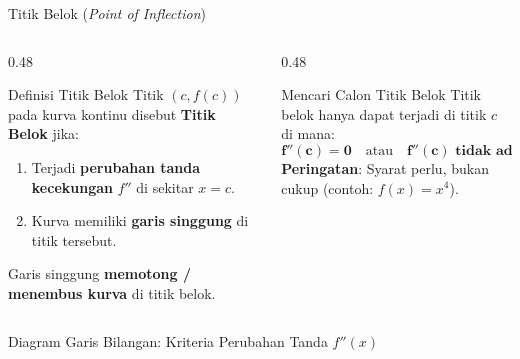\documentclass[aspectratio=169,10pt]{beamer}
\begin{document}
\begin{frame}{Titik Belok (\textit{Point of Inflection})}
    \begin{columns}[T]
        \begin{column}{0.48\textwidth}
            \begin{block}{Definisi Titik Belok}
                Titik $(c, f(c))$ pada kurva kontinu disebut \textbf{Titik Belok} jika:
                \begin{enumerate}
                    \item Terjadi \textbf{perubahan tanda kecekungan} $f''$ di sekitar $x = c$.
                    \item Kurva memiliki \textbf{garis singgung} di titik tersebut.
                \end{enumerate}
                {\scriptsize \color{SoftGray} Garis singgung \textbf{memotong / menembus kurva} di titik belok.}
            \end{block}
        \end{column}

        \begin{column}{0.48\textwidth}
            \begin{exampleblock}{Mencari Calon Titik Belok}
                Titik belok hanya dapat terjadi di titik $c$ di mana:
                \[
                    \mathbf{f''(c) = 0} \quad \text{atau} \quad \mathbf{f''(c) \text{ tidak ada}}
                \]
                {\scriptsize \color{SoftGray} \textbf{Peringatan}: Syarat perlu, bukan cukup (contoh: $f(x)=x^4$).}
            \end{exampleblock}
        \end{column}
    \end{columns}

    \vspace{0.02cm}
    \begin{exampleblock}{Diagram Garis Bilangan: Kriteria Perubahan Tanda $f''(x)$}
        \centering
\end{exampleblock}
\end{frame}
\end{document}
